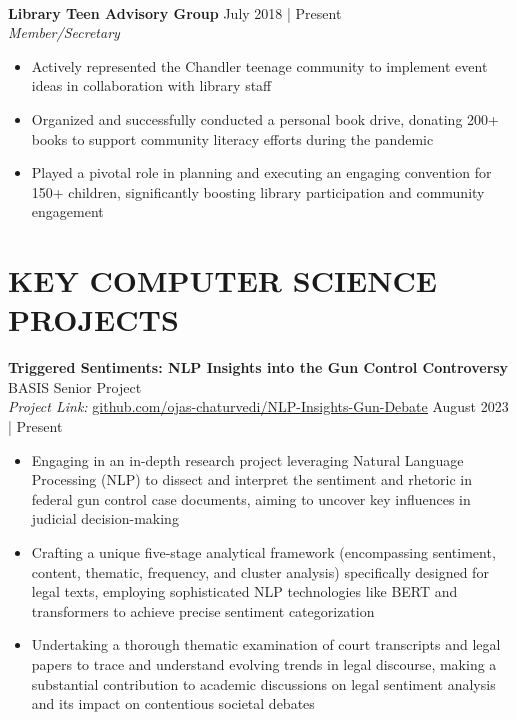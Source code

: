 \documentclass[a4paper,10pt]{extarticle}
\begin{document}
\noindent
\\ \textbf{Library Teen Advisory Group} \hfill July 2018 | Present \\
\textit{Member/Secretary}
\begin{itemize}
    \item Actively represented the Chandler teenage community to implement event ideas in collaboration with library staff
    \item Organized and successfully conducted a personal book drive, donating 200+ books to support community literacy efforts during the pandemic
    \item Played a pivotal role in planning and executing an engaging convention for 150+ children, significantly boosting library participation and community engagement
\end{itemize}

\section*{KEY COMPUTER SCIENCE PROJECTS}
\noindent
\textbf{Triggered Sentiments: NLP Insights into the Gun Control Controversy} \hfill BASIS Senior Project \\
\textit{Project Link:} \href{https://github.com/ojas-chaturvedi/NLP-Insights-Gun-Debate}{\underline{github.com/ojas-chaturvedi/NLP-Insights-Gun-Debate}} \hfill August 2023 | Present
\begin{itemize}
    \item Engaging in an in-depth research project leveraging Natural Language Processing (NLP) to dissect and interpret the sentiment and rhetoric in federal gun control case documents, aiming to uncover key influences in judicial decision-making
    \item Crafting a unique five-stage analytical framework (encompassing sentiment, content, thematic, frequency, and cluster analysis) specifically designed for legal texts, employing sophisticated NLP technologies like BERT and transformers to achieve precise sentiment categorization
    \item Undertaking a thorough thematic examination of court transcripts and legal papers to trace and understand evolving trends in legal discourse, making a substantial contribution to academic discussions on legal sentiment analysis and its impact on contentious societal debates
\end{itemize}
\end{document}
